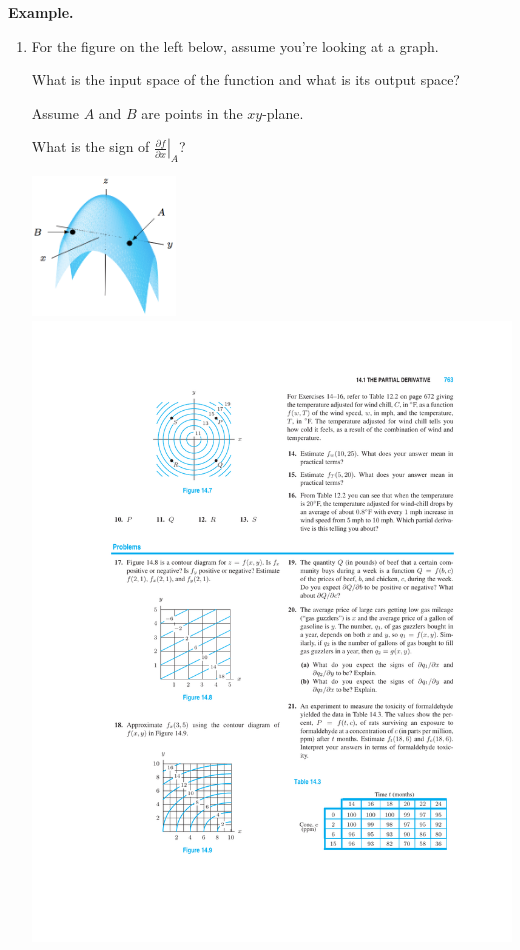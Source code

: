 \documentclass[12pt,letterpaper,noanswers]{exam}
\begin{document}
\noindent\textbf{Example.}
\begin{enumerate}
    \item For the figure on the left below, assume you're looking at a graph.
    
    What is the input space of the function and what is its output space?
    
    Assume $A$ and $B$ are points in the $xy$-plane.
    
    What is the sign of $\left.\frac{\partial f}{\partial x}\right\vert_A$?

\includegraphics[width=1.5in]{img/C05ex2.png}
\includegraphics{img/C05ctr.pdf}




\end{enumerate}
\end{document}
